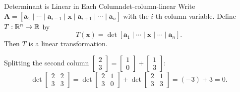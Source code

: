 \begin{theorem}{Determinant is Linear in Each Column}{det-column-linear}
  Write $\mathbf{A} = [\mathbf{a}_1 \mid \cdots \mid \mathbf{a}_{i-1} \mid \mathbf{x} \mid \mathbf{a}_{i+1} \mid \cdots \mid \mathbf{a}_n]$ with the $i$-th column variable. Define $T : \mathbb{R}^n \to \mathbb{R}$ by
  \[
    T(\mathbf{x}) = \det[\mathbf{a}_1 \mid \cdots \mid \mathbf{x} \mid \cdots \mid \mathbf{a}_n].
  \]
  Then $T$ is a linear transformation.
\end{theorem}

\begin{example}
  Splitting the second column $
    \begin{bmatrix}
      2 \\ 3
    \end{bmatrix}
    =
    \begin{bmatrix}
      1 \\ 0
    \end{bmatrix}
    +
    \begin{bmatrix}
      1 \\ 3
    \end{bmatrix}
  $:
  \[
    \det
    \begin{bmatrix}
      2 & 2 \\ 3 & 3
    \end{bmatrix}
    = \det
    \begin{bmatrix}
      2 & 1 \\ 3 & 0
    \end{bmatrix}
    + \det
    \begin{bmatrix}
      2 & 1 \\ 3 & 3
    \end{bmatrix}
    = (-3) + 3 = 0.
  \]

\end{example}

